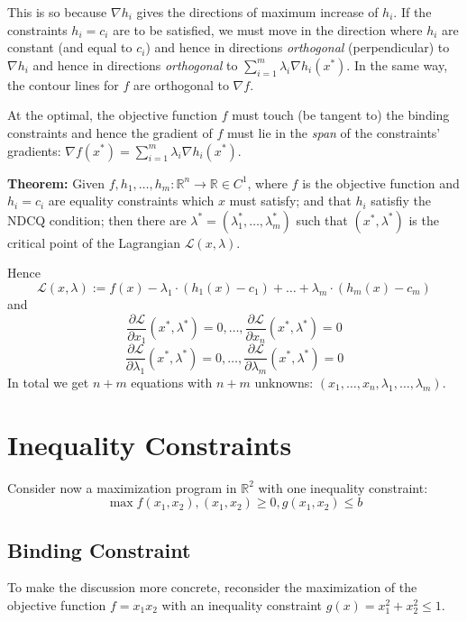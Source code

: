 \documentclass[11pt,]{article}
\begin{document}
This is so because \(\nabla h_i\) gives the directions of maximum
increase of \(h_i\). If the constraints \(h_i=c_i\) are to be satisfied,
we must move in the direction where \(h_i\) are constant (and equal to
\(c_i\)) and hence in directions \emph{orthogonal} (perpendicular) to
\(\nabla h_i\) and hence in directions \emph{orthogonal} to
\(\sum_{i=1}^m \lambda_i \nabla h_i(x^*)\). In the same way, the contour
lines for \(f\) are orthogonal to \(\nabla f\).

At the optimal, the objective function \(f\) must touch (be tangent to)
the binding constraints and hence the gradient of \(f\) must lie in the
\emph{span} of the constraints' gradients:
\(\nabla f(x^*)=\sum_{i=1}^m \lambda_i \nabla h_i(x^*)\).

\textbf{Theorem:} Given
\(f, h_1, \hdots, h_m:\mathbb{R}^n\to \mathbb{R}\in C^1\), where \(f\)
is the objective function and \(h_i=c_i\) are equality constraints which
\(x\) must satisfy; and that \(h_i\) satisfiy the NDCQ condition; then
there are \(\lambda^*=(\lambda_1^*,\hdots,\lambda_m^*)\) such that
\((x^*,\lambda^*)\) is the critical point of the Lagrangian
\(\mathcal{L}(x,\lambda)\).

Hence \[
\mathcal{L}(x,\lambda) := f(x)-\lambda_1\cdot(h_1(x)-c_1)+\hdots+\lambda_m\cdot(h_m(x)-c_m)
\] and \[
\frac{\partial\mathcal{L}}{\partial x_1}(x^*,\lambda^*)=0,\hdots,\frac{\partial \mathcal{L}}{\partial x_n}(x^*,\lambda^*)=0
\] \[
\frac{\partial\mathcal{L}}{\partial \lambda_1}(x^*,\lambda^*)=0,\hdots,\frac{\partial \mathcal{L}}{\partial \lambda_m}(x^*,\lambda^*)=0
\] In total we get \(n+m\) equations with \(n+m\) unknowns:
\((x_1,\hdots,x_n,\lambda_1,\hdots,\lambda_m)\).

\section{Inequality Constraints}\label{inequality-constraints}

Consider now a maximization program in \(\mathbb{R}^2\) with one
inequality constraint: \[
\max f(x_1, x_2), (x_1, x_2)\geq 0, g(x_1, x_2)\leq b
\]

\subsection{Binding Constraint}\label{binding-constraint}

To make the discussion more concrete, reconsider the maximization of the
objective function \(f=x_1x_2\) with an inequality constraint
\(g(x) = x_1^2+x_2^2\leq 1\).
\end{document}
